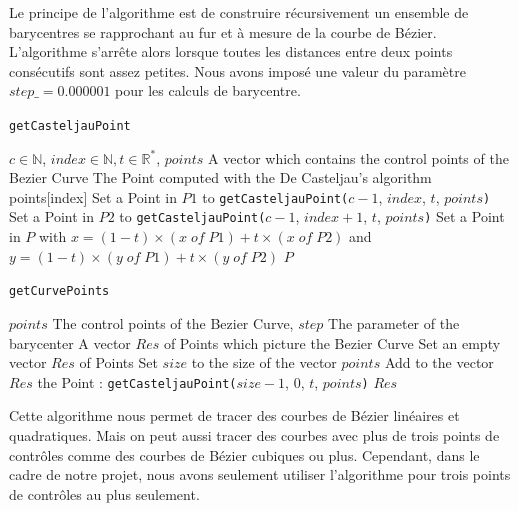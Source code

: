 \documentclass[a4paper, 12pt]{article}
\begin{document}
Le principe de l'algorithme est de construire récursivement un ensemble de barycentres se rapprochant au fur et à mesure de la courbe de Bézier. L'algorithme s'arrête alors lorsque toutes les distances entre deux points consécutifs sont assez petites.
Nous avons imposé une valeur du paramètre $step\_ = 0.000001$ pour les calculs de barycentre.

\begin{algorithm}
	\caption{\texttt{getCasteljauPoint}}
		\begin{algorithmic}[1]
		\Require $c \in \mathbb{N}$, $index \in \mathbb{N}, t \in \mathbb{R}^{*}$, $points$ A vector which contains the control points of the Bezier Curve
		\Ensure The Point computed with the De Casteljau's algorithm
			\State \Return points[index] 
		\EndIf
		\State Set a Point in $P1$ to \texttt{getCasteljauPoint(}$c-1$, $index$, $t$, $points$\texttt{)} 
		\State Set a Point in $P2$ to \texttt{getCasteljauPoint(}$c-1$, $index+1$, $t$, $points$\texttt{)} 
		\State Set a Point in $P$ with $x = (1-t) \times (x \; of \; P1) + t \times (x \; of \; P2)$ and $y = (1-t) \times (y \; of \; P1) + t \times (y \; of \; P2)$
		\State \Return $P$
		\EndFunction
		\end{algorithmic}
\end{algorithm}

\begin{algorithm}
	\caption{\texttt{getCurvePoints}}
		\begin{algorithmic}[1]
		\Require $points$ The control points of the Bezier Curve, $step$ The parameter of the barycenter
		\Ensure A vector $Res$ of Points which picture the Bezier Curve
		\State Set an empty vector $Res$ of Points
		\State Set $size$ to the size of the vector $points$
			\State Add to the vector $Res$ the Point : \texttt{getCasteljauPoint(}$size-1$, $0$, $t$, $points$\texttt{)} 
		\EndFor
		\State \Return $Res$
		\EndFunction
		\end{algorithmic}
\end{algorithm}

Cette algorithme nous permet de tracer des courbes de Bézier linéaires et quadratiques. Mais on peut aussi tracer des courbes avec plus de trois points de contrôles comme des courbes de Bézier cubiques ou plus. Cependant, dans le cadre de notre projet, nous avons seulement utiliser l'algorithme pour trois points de contrôles au plus seulement.
\end{document}
